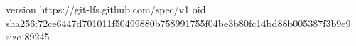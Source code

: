 version https://git-lfs.github.com/spec/v1
oid sha256:72ce6447d701011f50499880b758991755f04be3b80fc14bd88b005387f3b9e9
size 89245
